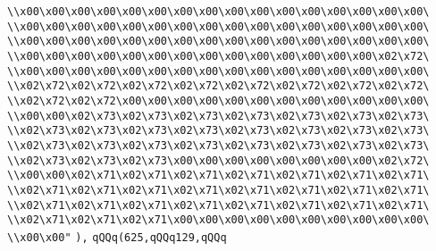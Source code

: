 \verb|\\x00\x00\x00\x00\x00\x00\x00\x00\x00\x00\x00\x00\x00\x00\x00\x00\|\newline
\verb|\\x00\x00\x00\x00\x00\x00\x00\x00\x00\x00\x00\x00\x00\x00\x00\x00\|\newline
\verb|\\x00\x00\x00\x00\x00\x00\x00\x00\x00\x00\x00\x00\x00\x00\x00\x00\|\newline
\verb|\\x00\x00\x00\x00\x00\x00\x00\x00\x00\x00\x00\x00\x00\x00\x02\x72\|\newline
\verb|\\x00\x00\x00\x00\x00\x00\x00\x00\x00\x00\x00\x00\x00\x00\x00\x00\|\newline
\verb|\\x02\x72\x02\x72\x02\x72\x02\x72\x02\x72\x02\x72\x02\x72\x02\x72\|\newline
\verb|\\x02\x72\x02\x72\x00\x00\x00\x00\x00\x00\x00\x00\x00\x00\x00\x00\|\newline
\verb|\\x00\x00\x02\x73\x02\x73\x02\x73\x02\x73\x02\x73\x02\x73\x02\x73\|\newline
\verb|\\x02\x73\x02\x73\x02\x73\x02\x73\x02\x73\x02\x73\x02\x73\x02\x73\|\newline
\verb|\\x02\x73\x02\x73\x02\x73\x02\x73\x02\x73\x02\x73\x02\x73\x02\x73\|\newline
\verb|\\x02\x73\x02\x73\x02\x73\x00\x00\x00\x00\x00\x00\x00\x00\x02\x72\|\newline
\verb|\\x00\x00\x02\x71\x02\x71\x02\x71\x02\x71\x02\x71\x02\x71\x02\x71\|\newline
\verb|\\x02\x71\x02\x71\x02\x71\x02\x71\x02\x71\x02\x71\x02\x71\x02\x71\|\newline
\verb|\\x02\x71\x02\x71\x02\x71\x02\x71\x02\x71\x02\x71\x02\x71\x02\x71\|\newline
\verb|\\x02\x71\x02\x71\x02\x71\x00\x00\x00\x00\x00\x00\x00\x00\x00\x00\|\newline
\verb|\\x00\x00"|\newline
\verb|),|\newline
\verb|qQQq(625,qQQq129,qQQq|\newline

